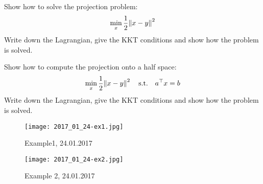 \documentclass{article}
\begin{document}
\begin{question}
  Show how to solve the projection problem:
  \[
    \min_x \frac{1}{2} \enVert{x - y}^2
  \]
  Write down the Lagrangian, give the KKT conditions and show how the
problem is solved.
\end{question}

\begin{question}
  Show how to compute the projection onto a half space:
  \[
    \min_x \frac{1}{2} \enVert{x-y}^2 \quad \text{s.t.} \quad \T{a}x = b
  \]
  Write down the Lagrangian, give the KKT conditions and show how the
  problem is solved.
\end{question}


\begin{figure}[H]
  \texttt{[image: 2017\_01\_24-ex1.jpg]}
  \caption{Example1,  24.01.2017\label{fig:ex1}}
\end{figure}

\begin{figure}[H]
  \texttt{[image: 2017\_01\_24-ex2.jpg]}
  \caption{Example 2,  24.01.2017\label{fig:ex2}}
\end{figure}
\end{document}
